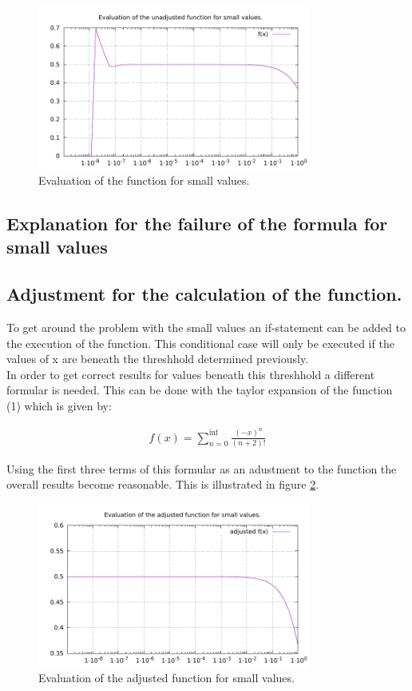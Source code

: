 \begin{figure}[t]
    \centering
    \includegraphics[width=0.8\textwidth]{../analysis/f.pdf}
    \caption{Evaluation of the function for small values.}
    \label{fig::f}
\end{figure}


\subsection{Explanation for the failure of the formula for small values}


\subsection{Adjustment for the calculation of the function.}

To get around the problem with the small values an if-statement can be
added to the execution of the function. This conditional case
will only be executed if the values of x are beneath the threshhold determined 
previously.\\
In order to get correct results for values beneath this threshhold
a different formular is needed. This can be done with the taylor
expansion of the function (1) which is given by:

\begin{align}
    f(x) = \sum_{n=0}^{\inf}\frac{(-x)^n}{(n+2)!}    
\end{align} 

Using the first three terms of this formular as an adustment to the function the overall 
results become reasonable. This is illustrated in figure \ref{fig::adjustedF}.

\begin{figure}[h]
    \centering
    \includegraphics[width=0.8\textwidth]{../analysis/adjustedF.pdf}
    \caption{Evaluation of the adjusted function for small values.}
    \label{fig::adjustedF}
\end{figure}